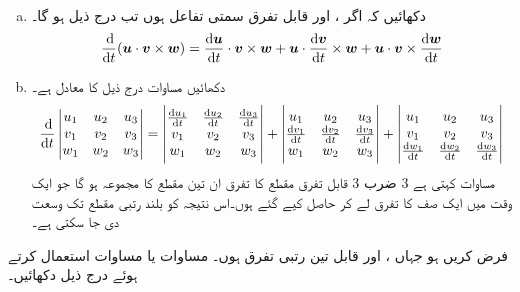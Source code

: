 \\
\begin{enumerate}[a.]
\item
دکھائیں کہ اگر ،  اور  قابل تفرق سمتی تفاعل ہوں تب درج ذیل ہو گا۔
\begin{align}\label{مساوات_سمتی_تفاعل_سہ_ضرب_تفرق_الف}
\frac{\dif}{\dif t}(\kvec{u}\cdot\kvec{v}\times\kvec{w})=\frac{\dif \kvec{u}}{\dif t}\cdot\kvec{v}\times\kvec{w}+\kvec{u}\cdot\frac{\dif \kvec{v}}{\dif t}\times\kvec{w}+\kvec{u}\cdot\kvec{v}\times\frac{\dif \kvec{w}}{\dif t}
\end{align}
\item
دکھائیں مساوات  درج ذیل کا معادل ہے۔
\begin{align}\label{مساوات_سمتی_تفاعل_سہ_ضرب_تفرق_ب}
\frac{\dif}{\dif t}\begin{vmatrix}u_1&u_2&u_3\\v_1&v_2&v_3\\w_1&w_2&w_3  \end{vmatrix}=
\begin{vmatrix}
\frac{\dif u_1}{\dif t}&\frac{\dif u_2}{\dif t}&\frac{\dif u_3}{\dif t}\\v_1&v_2&v_3\\w_1&w_2&w_3
\end{vmatrix}+
\begin{vmatrix}
u_1&u_2&u_3\\
\frac{\dif v_1}{\dif t}&\frac{\dif v_2}{\dif t}&\frac{\dif v_3}{\dif t}\\w_1&w_2&w_3
\end{vmatrix}+
\begin{vmatrix}
u_1&u_2&u_3\\
v_1&v_2&v_3\\
\frac{\dif w_1}{\dif t}&\frac{\dif w_2}{\dif t}&\frac{\dif w_3}{\dif t}
\end{vmatrix}
\end{align}
مساوات  کہتی ہے  3 ضرب 3 قابل تفرق مقطع کا تفرق ان تین مقطع کا مجموعہ ہو گا جو ایک وقت میں  ایک  صف کا تفرق لے کر حاصل کیے گئے ہوں۔اس نتیجہ  کو بلند رتبی  مقطع تک وسعت دی جا سکتی ہے۔ 
\end{enumerate}
فرض کریں  ہو جہاں ،  اور  قابل تین رتبی تفرق ہوں۔ مساوات  یا مساوات  استعمال کرتے ہوئے  درج ذیل دکھائیں۔
